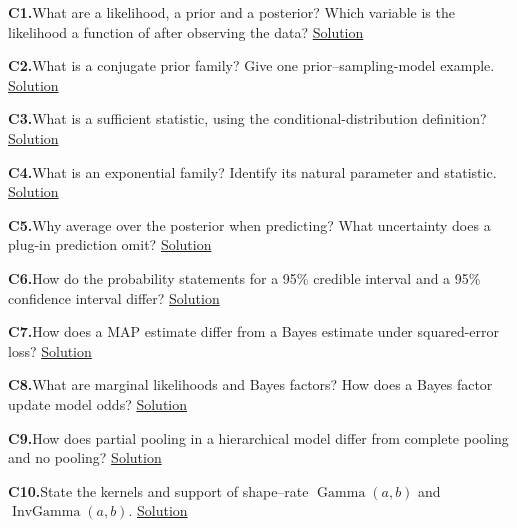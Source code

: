 \documentclass[11pt,a4paper]{article}
\DeclareMathOperator{\InvGamma}{InvGamma}
\newcommand{\concepttopic}[1]{%
  \par\addvspace{8pt}\noindent{\color{statblue}\bfseries #1}\par\nobreak\smallskip}
\newcommand{\conceptquestion}[3]{%
  \par\addvspace{4pt}\noindent%
  \hypertarget{concept-question:#1}{}%
  \label{#3}%
  \textbf{C#1.}\enspace #2%
  \unskip\nobreak\hspace{0.4em}\mbox{\hyperlink{concept-answer:#1}{\textcolor{statblue}{Solution}}}\par}
\begin{document}
\begingroup
\fontsize{10.5}{12.5}\selectfont
\setlength{\parskip}{0pt}
\setlength{\columnsep}{7mm}
\setlength{\multicolsep}{4pt}
\begin{multicols}{2}
\raggedcolumns
\raggedright
\concepttopic{Bayesian foundations}
\conceptquestion{1}{What are a likelihood, a prior and a posterior? Which variable is the likelihood a function of after observing the data?}{question:concept-likelihood-prior-and-posterior}
\conceptquestion{2}{What is a conjugate prior family? Give one prior--sampling-model example.}{question:concept-conjugacy}
\conceptquestion{3}{What is a sufficient statistic, using the conditional-distribution definition?}{question:concept-sufficiency}
\conceptquestion{4}{What is an exponential family? Identify its natural parameter and statistic.}{question:concept-exponential-family}
\conceptquestion{5}{Why average over the posterior when predicting? What uncertainty does a plug-in prediction omit?}{question:concept-posterior-prediction}
\conceptquestion{6}{How do the probability statements for a 95\% credible interval and a 95\% confidence interval differ?}{question:concept-two-kinds-of-interval}
\conceptquestion{7}{How does a MAP estimate differ from a Bayes estimate under squared-error loss?}{question:concept-map-and-squared-error-loss}
\conceptquestion{8}{What are marginal likelihoods and Bayes factors? How does a Bayes factor update model odds?}{question:concept-evidence-and-model-odds}
\conceptquestion{9}{How does partial pooling in a hierarchical model differ from complete pooling and no pooling?}{question:concept-pooling}
\conceptquestion{10}{State the kernels and support of shape--rate $\operatorname{Gamma}(a,b)$ and $\InvGamma(a,b)$.}{question:concept-gamma-and-inverse-gamma-kernels}


\end{multicols}
\end{document}
